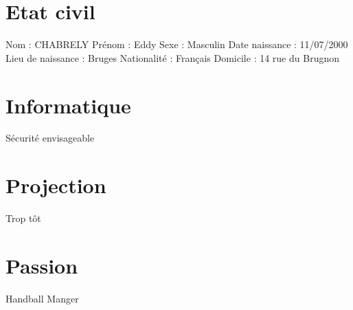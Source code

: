 \documentclass{article}
\begin{document}
\section{Etat civil}
Nom : CHABRELY
\newline
Prénom : Eddy
\newline
Sexe : Masculin
\newline
Date naissance : 11/07/2000
\newline
Lieu de naissance : Bruges 
\newline
Nationalité : Français
\newline
Domicile : 14 rue du Brugnon


\section{Informatique}
Sécurité envisageable

\section{Projection}
Trop tôt

\section{Passion}
Handball
Manger
\end{document}
